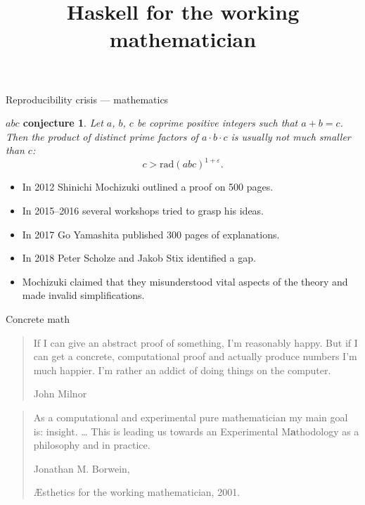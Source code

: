 \documentclass[handout]{beamer}
\newtheorem{conjecture}[theorem]{$abc$ conjecture}
\begin{document}
\begin{frame}{Reproducibility crisis --- mathematics}

\begin{conjecture}
  Let $a$, $b$, $c$ be coprime positive integers such that $a+b = c$.
  Then the product of distinct prime factors of $a\cdot b\cdot c$
  is usually not much smaller than $c$:
  $$
    c > \mathrm{rad}(abc)^{1+\varepsilon}.
  $$
\end{conjecture}

\begin{itemize}[<+->]
\item
  In 2012 Shinichi Mochizuki outlined a proof on 500 pages.
\item
  In 2015--2016 several workshops
  tried to grasp his ideas.
\item
  In 2017 Go Yamashita published 300 pages of explanations.
\item
  In 2018 Peter Scholze and Jakob Stix identified a gap.
\item
  Mochizuki claimed that they misunderstood vital aspects
  of the theory and made invalid simplifications.
\end{itemize}

\end{frame}


\begin{frame}{Concrete math}

\begin{quotation}
If I can give an abstract proof of something,
I'm reasonably happy. But if I can get a concrete,
computational proof and actually produce numbers
I'm much happier. I'm rather an addict of doing things
on the computer.

\hfill John Milnor
\end{quotation}

\bigskip

\pause

\begin{quotation}
As a computational and experimental pure mathematician
my main goal is: {\sf insight}. \ldots
This is leading us towards an {\sf Experimental M{\bf a}thodology}
as a philosophy and in practice.

\hfill Jonathan M. Borwein,

\hfill \AE sthetics for the working mathematician, 2001.
\end{quotation}

\end{frame}

\title{Haskell for the working mathematician}
\end{document}
